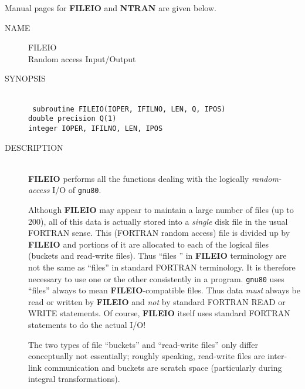 Manual pages for {\bf FILEIO} and {\bf NTRAN} are given below.
\newpage
\begin{description}
\item[NAME] FILEIO \\
Random access Input/Output
\item[SYNOPSIS] \ \\
{\tt
   subroutine FILEIO(IOPER, IFILNO, LEN, Q, IPOS) \\
   double precision Q(1) \\
   integer IOPER, IFILNO, LEN, IPOS \\
}
\item[DESCRIPTION] \ \\
{\bf FILEIO} performs all the  functions  dealing  with the logically
{\em random-access} I/O of {\tt gnu80}.
 
Although {\bf FILEIO} may appear to maintain a large  number  of
files  (up  to 200), all of this data is actually stored into a
{\em single}  disk file in the usual FORTRAN sense.  
This (FORTRAN random access) file is divided  up by {\bf FILEIO}
and  portions of it are allocated to each of the logical files
(buckets and read-write files). Thus ``files '' in
{\bf FILEIO} terminology are not the same as ``files'' 
in standard FORTRAN terminology. It is therefore necessary to
use one or the other consistently in a program. {\tt gnu80} uses
``files'' always to mean {\bf FILEIO}-compatible
files. Thus data {\em must} always be read or written by {\bf FILEIO}
and {\em not} by standard FORTRAN READ or WRITE statements.
Of course, {\bf FILEIO} itself uses standard FORTRAN statements
to do the actual I/O!

The two types of file ``buckets'' and ``read-write
files'' only differ conceptually not essentially; roughly
speaking, read-write files are inter-link communication
and buckets are scratch space (particularly during integral
transformations).


\end{description}
